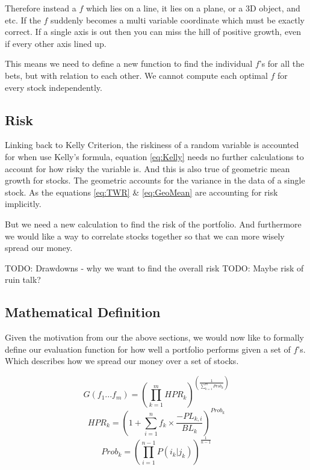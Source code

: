 \documentclass[12pt]{article}
\begin{document}
    Therefore instead a \(f\) which lies on a line, it lies on a plane, or a 3D object, 
    and etc. If the \(f\) suddenly becomes a multi variable coordinate which must be 
    exactly correct. If a single axis is out then you can miss the hill of positive 
    growth, even if every other axis lined up.

    This means we need to define a new function to find the individual \(f\)'s for all the bets,
    but with relation to each other. We cannot compute each optimal \(f\) for every stock
    independently.


\subsection{Risk}

    Linking back to Kelly Criterion, the riskiness of a random variable is accounted for
    when use Kelly's formula, equation \ref{eq:Kelly} needs no further calculations
    to account for how risky the variable is. And this is also true of geometric mean growth
    for stocks. The geometric accounts for the variance in the data of a single stock. As the
    equations \ref{eq:TWR} \& \ref{eq:GeoMean} are accounting for risk implicitly.

    But we need a new calculation to find the risk of the portfolio. And furthermore we would
    like a way to correlate stocks together so that we can more wisely spread our money.

    TODO: Drawdowns - why we want to find the overall risk
    TODO: Maybe risk of ruin talk?


\subsection{Mathematical Definition}

    Given the motivation from our the above sections, we would now like to formally define our
    evaluation function for how well a portfolio performs given a set of \(f\)'s. Which describes
    how we spread our money over a set of stocks.

    \begin{equation}\label{eq:G}
        G(f_1...f_m) = \left( \displaystyle\prod^{m}_{k=1} HPR_k \right) ^{ \left( \displaystyle\frac{1}{\sum^{m}_{k=1}Prob_k} \right)}
    \end{equation}
    \begin{equation}\label{eq:HPR_k}
        HPR_k = \left( 1 +  \displaystyle\sum^{n}_{i=1} f_k \times \frac{- PL_{k,i}}{BL_k} \right) ^{Prob_k}
    \end{equation}
    \begin{equation}\label{eq:Prob_k}
        Prob_k = \left( \displaystyle\prod^{n - 1}_{i=1} P(i_k | j_k)\right)^{\frac{1}{n - 1}}
    \end{equation}
\end{document}
